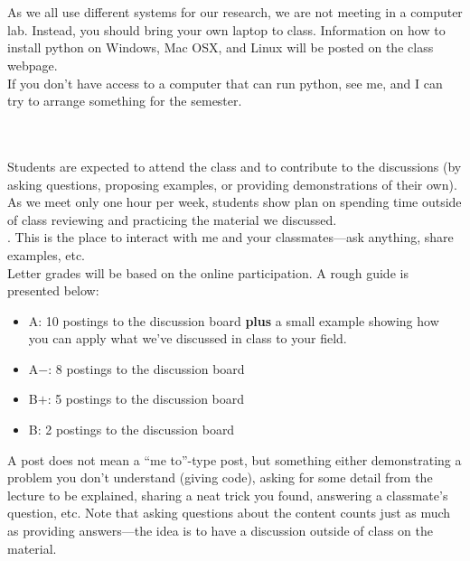\documentclass[11pt]{article}
\begin{document}
\ \\[-2mm]
 \\
%
As we all use different systems for our research, we are not meeting
in a computer lab.  Instead, you should bring your own laptop to
class.  Information on how to install python on Windows, Mac OSX, and
Linux will be posted on the class webpage. \\

\noindent
If you don't have access to a computer that can run python, see me,
and I can try to arrange something for the semester.

\ \\[-2mm]
 \\
%
Students are expected to attend the class and to contribute
to the discussions (by asking questions, proposing examples, or
providing demonstrations of their own).  As we meet only one hour per
week, students show plan on spending time outside of class reviewing
and practicing the material we discussed. \\

.  This is the place to interact with
me and your classmates---ask anything, share examples, etc. \\

\noindent Letter grades will be based on the online participation.  A
rough guide is presented below:
\begin{itemize}
\item {\sf A\phantom{+}}: 10 postings to the discussion board
  {\bf plus} a small example showing how you can apply what
  we've discussed in class to your field.

\item {\sf A$-$}: 8 postings to the discussion board

\item {\sf B$+$}: 5 postings to the discussion board

\item {\sf B\phantom{+}}:  2 postings to the discussion board
\end{itemize}
A post does not mean a ``me to''-type post, but something either
demonstrating a problem you don't understand (giving code), asking for
some detail from the lecture to be explained, sharing a neat trick you
found, answering a classmate's question, etc.  Note that asking
questions about the content counts just as much as providing
answers---the idea is to have a discussion outside of class on the
material.
\end{document}
